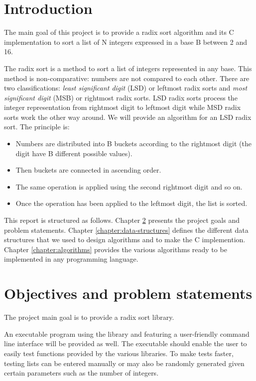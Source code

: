 \documentclass[book, nodocumentinfo]{upmethodology-document}
\begin{document}
\chapter{Introduction}

The main goal of this project is to provide a radix sort algorithm and its C implementation
to sort a list of N integers expressed in a base B between 2 and 16.

The radix sort is a method to sort a list of integers represented in any base.
This method is non-comparative: numbers are not compared to each other.
There are two classifications: \emph{least significant digit} (LSD) or leftmost radix sorts
and \emph{most significant digit} (MSB) or rightmost radix sorts.
LSD radix sorts process the integer representation from rightmost digit to leftmost digit
while MSD radix sorts work the other way around.
We will provide an algorithm for an LSD radix sort.
The principle is:
\begin{itemize}
    \item Numbers are distributed into B buckets according to the rightmost
        digit (the digit have B different possible values).
    \item Then buckets are connected in ascending order.
    \item The same operation is applied using the second rightmost digit and so on.
    \item Once the operation has been applied to the leftmost digit, the list is sorted.
\end{itemize}

This report is structured as follows.
Chapter \ref{chapter:objectives-problem} presents the project goals and problem statements.
Chapter \ref{chapter:data-structures} defines the different data structures that we used to design algorithms
and to make the C implemention.
Chapter \ref{chapter:algorithms} provides the various algorithms ready to be implemented in any programming language.

\tableofcontents

\listofalgorithms

\chapter{Objectives and problem statements} \label{chapter:objectives-problem}

The project main goal is to provide a radix sort library.

An executable program using the library and featuring a user-friendly command line interface
will be provided as well.
The executable should enable the user to easily test functions provided by the various libraries.
To make tests faster, testing lists can be entered manually or may also be randomly generated
given certain parameters such as the number of integers.
\end{document}

